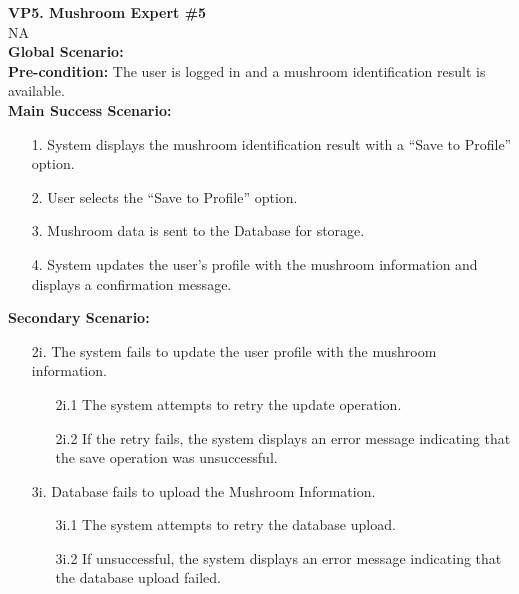\documentclass[]{article}
\begin{document}
\begin{enumerate}[{\bf BE1.}]
	    \textbf{VP5. Mushroom Expert \#5}\\
	    NA\\[1mm]
	    
	    \textbf{Global Scenario:}\\
	    \textbf{Pre-condition:} The user is logged in and a mushroom identification result is available.\\[1mm]
	    \textbf{Main Success Scenario:}
	    \begin{enumerate}
	        \item[1.] System displays the mushroom identification result with a ``Save to Profile'' option.
	        \item[2.] User selects the ``Save to Profile'' option.
	        \item[3.] Mushroom data is sent to the Database for storage.
	        \item[4.] System updates the user's profile with the mushroom information and displays a confirmation message.
	    \end{enumerate}
	    \textbf{Secondary Scenario:}
	    {\color{red}
	    \begin{enumerate}
	        \item[2i. ] The system fails to update the user profile with the mushroom information.
	        \begin{enumerate}
	            \item[2i.1] The system attempts to retry the update operation.
	            \item[2i.2] If the retry fails, the system displays an error message indicating that the save operation was unsuccessful. 
	        \end{enumerate}
	        \item[3i.] Database fails to upload the Mushroom Information.
	        \begin{enumerate}
	            \item[3i.1] The system attempts to retry the database upload.
	            \item[3i.2] If unsuccessful, the system displays an error message indicating that the database upload failed.
	        \end{enumerate}
	    \end{enumerate}
	    }


\end{enumerate}
\end{document}
